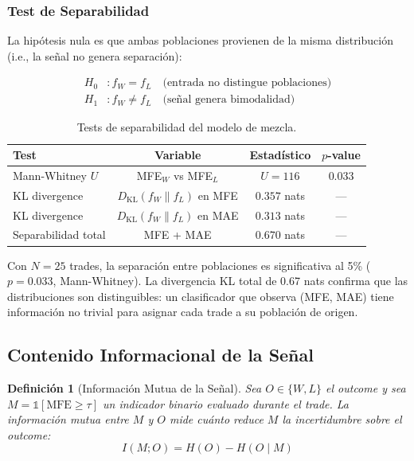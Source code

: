 \documentclass[11pt,a4paper]{article}
\newtheorem{definition}{Definici\'on}[section]
\begin{document}
\subsubsection{Test de Separabilidad}

La hip\'otesis nula es que ambas poblaciones provienen de la
misma distribuci\'on (i.e., la se\~nal no genera separaci\'on):

\begin{align}
H_0&: f_W = f_L \quad \text{(entrada no distingue poblaciones)} \\
H_1&: f_W \neq f_L \quad \text{(se\~nal genera bimodalidad)}
\end{align}

\begin{table}[H]
\centering
\caption{Tests de separabilidad del modelo de mezcla.}
\label{tab:separation_tests}
\begin{tabular}{lccc}
\toprule
\textbf{Test} & \textbf{Variable} & \textbf{Estad\'istico} & \textbf{$p$-value} \\
\midrule
Mann-Whitney $U$ & MFE$_W$ vs MFE$_L$ & $U = 116$ & $\bm{0.033}$ \\
KL divergence & $D_{\text{KL}}(f_W \| f_L)$ en MFE & $0.357$ nats & --- \\
KL divergence & $D_{\text{KL}}(f_W \| f_L)$ en MAE & $0.313$ nats & --- \\
\midrule
Separabilidad total & MFE + MAE & $0.670$ nats & --- \\
\bottomrule
\end{tabular}
\end{table}

\begin{tcolorbox}[thmbox, title=Resultado 1: Separabilidad Significativa]
Con $N=25$ trades, la separaci\'on entre poblaciones es significativa
al 5\% ($p = 0.033$, Mann-Whitney). La divergencia KL total de 0.67 nats
confirma que las distribuciones son distinguibles: un clasificador
que observa (MFE, MAE) tiene informaci\'on no trivial para asignar
cada trade a su poblaci\'on de origen.
\end{tcolorbox}


\subsection{Contenido Informacional de la Se\~nal}

\begin{definition}[Informaci\'on Mutua de la Se\~nal]
\label{def:mutual_info}
Sea $O \in \{W, L\}$ el outcome y sea $M = \mathbb{1}[\text{MFE} \geq \tau]$
un indicador binario evaluado durante el trade. La informaci\'on
mutua entre $M$ y $O$ mide cu\'anto reduce $M$ la incertidumbre
sobre el outcome:
\begin{equation}
I(M; O) = H(O) - H(O \mid M)
\label{eq:mutual_info}
\end{equation}
\end{definition}
\end{document}

